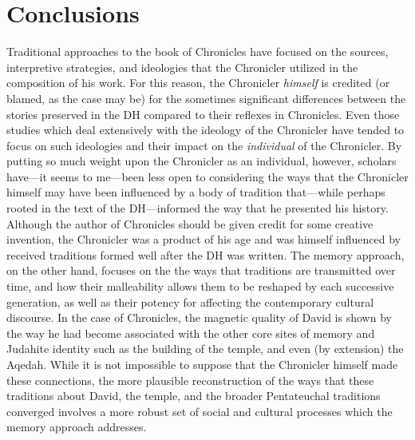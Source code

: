 \hypertarget{conclusions}{%
\section{Conclusions}\label{conclusions}}

Traditional approaches to the book of Chronicles have focused on the
sources, interpretive strategies, and ideologies that the Chronicler
utilized in the composition of his work. For this reason, the Chronicler
\emph{himself} is credited (or blamed, as the case may be) for the
sometimes significant differences between the stories preserved in the
DH compared to their reflexes in Chronicles. Even those studies which
deal extensively with the ideology of the Chronicler have tended to
focus on such ideologies and their impact on the \emph{individual} of
the Chronicler. By putting so much weight upon the Chronicler as an
individual, however, scholars have---it seems to me---been less open to
considering the ways that the Chronicler himself may have been
influenced by a body of tradition that---while perhaps rooted in the
text of the DH---informed the way that he presented his history.
Although the author of Chronicles should be given credit for some
creative invention, the Chronicler was a product of his age and was
himself influenced by received traditions formed well after the DH was
written. The memory approach, on the other hand, focuses on the the ways
that traditions are transmitted over time, and how their malleability
allows them to be reshaped by each successive generation, as well as
their potency for affecting the contemporary cultural discourse. In the
case of Chronicles, the magnetic quality of David is shown by the way he
had become associated with the other core sites of memory and Judahite
identity such as the building of the temple, and even (by extension) the
Aqedah. While it is not impossible to suppose that the Chronicler
himself made these connections, the more plausible reconstruction of the
ways that these traditions about David, the temple, and the broader
Pentateuchal traditions converged involves a more robust set of social
and cultural processes which the memory approach addresses.
